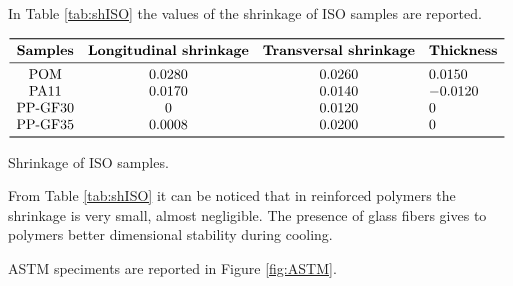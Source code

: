\documentclass[a4paper, 11pt]{article}
\begin{document}
In Table \ref{tab:shISO} the values of the shrinkage of ISO samples are reported.

\begin{table}[htp]
\centering
$
\begin{array}{cccl}
\toprule
\textbf{Samples} & \textbf{Longitudinal shrinkage} & \textbf{Transversal shrinkage} & \textbf{Thickness} \\
\midrule
\text{POM} & 0.0280 & 0.0260 & 0.0150 \\
\text{PA11} & 0.0170 & 0.0140 & -0.0120 \\
\text{PP-GF30} & 0 & 0.0120 & 0  \\
\text{PP-GF35} & 0.0008 & 0.0200 & 0  \\
\bottomrule
\end{array}
$
\caption{Shrinkage of ISO samples.}
\label{tab:shISO}
\end{table}

From Table \ref{tab:shISO} it can be noticed that in reinforced polymers the shrinkage is very small, almost negligible. The presence of glass fibers gives to polymers better dimensional stability during cooling.

ASTM speciments are reported in Figure \ref{fig:ASTM}.
\end{document}
